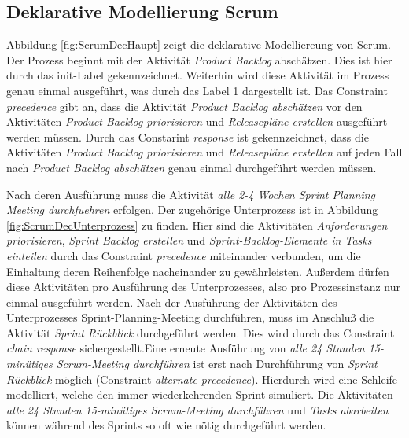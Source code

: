 \subsection{Deklarative Modellierung Scrum}

Abbildung \ref{fig:ScrumDecHaupt} zeigt die deklarative Modelliereung von Scrum.\newline
Der Prozess beginnt mit der Aktivität \textit{Product Backlog} abschätzen. Dies ist hier durch das init-Label gekennzeichnet. Weiterhin wird diese Aktivität im Prozess genau einmal ausgeführt, was durch das Label 1 dargestellt ist. Das Constraint \textit{precedence} gibt an, dass die Aktivität \textit{Product Backlog abschätzen} vor den Aktivitäten \textit{Product Backlog priorisieren} und \textit{Releasepläne erstellen} ausgeführt werden müssen. Durch das Constarint \textit{response} ist gekennzeichnet, dass die Aktivitäten \textit{Product Backlog priorisieren} und \textit{Releasepläne erstellen} auf jeden Fall nach \textit{Product Backlog abschätzen} genau einmal durchgeführt werden müssen. \newline

Nach deren Ausführung muss die Aktivität \textit{alle 2-4 Wochen Sprint Planning Meeting durchfuehren} erfolgen. Der zugehörige Unterprozess ist in Abbildung \ref{fig:ScrumDecUnterprozess} zu finden. Hier sind die Aktivitäten \textit{Anforderungen priorisieren}, \textit{Sprint Backlog erstellen} und \textit{Sprint-Backlog-Elemente in Tasks einteilen} durch das Constraint \textit{precedence} miteinander verbunden, um die Einhaltung deren Reihenfolge nacheinander zu gewährleisten. Außerdem dürfen diese Aktivitäten pro Ausführung des Unterprozesses, also pro Prozessinstanz nur einmal ausgeführt werden.\newline
Nach der Ausführung der Aktivitäten des Unterprozesses Sprint-Planning-Meeting durchführen, muss im Anschluß die Aktivität \textit{Sprint Rückblick} durchgeführt werden. Dies wird durch das Constraint \textit{chain response} sichergestellt.Eine erneute Ausführung von  \textit{alle 24 Stunden 15-minütiges Scrum-Meeting durchführen} ist erst nach Durchführung von \textit{Sprint Rückblick} möglich (Constraint \textit{alternate precedence}). Hierdurch wird eine Schleife modelliert, welche den immer wiederkehrenden Sprint simuliert.\newline
Die Aktivitäten \textit{alle 24 Stunden 15-minütiges Scrum-Meeting durchführen} und \textit{Tasks abarbeiten} können während des Sprints so oft wie nötig durchgeführt werden.


